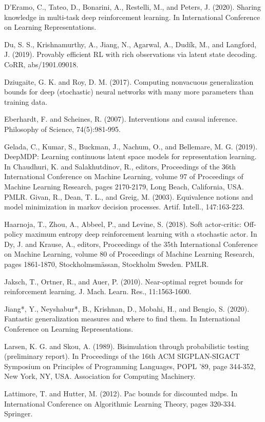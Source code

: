 \documentclass[10pt]{article}
\begin{document}
D'Eramo, C., Tateo, D., Bonarini, A., Restelli, M., and Peters, J. (2020). Sharing knowledge in multi-task deep reinforcement learning. In International Conference on Learning Representations.

Du, S. S., Krishnamurthy, A., Jiang, N., Agarwal, A., Dudík, M., and Langford, J. (2019). Provably efficient RL with rich observations via latent state decoding. CoRR, abs/1901.09018.

Dziugaite, G. K. and Roy, D. M. (2017). Computing nonvacuous generalization bounds for deep (stochastic) neural networks with many more parameters than training data.

Eberhardt, F. and Scheines, R. (2007). Interventions and causal inference. Philosophy of Science, 74(5):981-995.

Gelada, C., Kumar, S., Buckman, J., Nachum, O., and Bellemare, M. G. (2019). DeepMDP: Learning continuous latent space models for representation learning. In Chaudhuri, K. and Salakhutdinov, R., editors, Proceedings of the 36th International Conference on Machine Learning, volume 97 of Proceedings of Machine Learning Research, pages 2170-2179, Long Beach, California, USA. PMLR. Givan, R., Dean, T. L., and Greig, M. (2003). Equivalence notions and model minimization in markov decision processes. Artif. Intell., 147:163-223.

Haarnoja, T., Zhou, A., Abbeel, P., and Levine, S. (2018). Soft actor-critic: Off-policy maximum entropy deep reinforcement learning with a stochastic actor. In Dy, J. and Krause, A., editors, Proceedings of the 35th International Conference on Machine Learning, volume 80 of Proceedings of Machine Learning Research, pages 1861-1870, Stockholmsmässan, Stockholm Sweden. PMLR.

Jaksch, T., Ortner, R., and Auer, P. (2010). Near-optimal regret bounds for reinforcement learning. J. Mach. Learn. Res., 11:1563-1600.

Jiang*, Y., Neyshabur*, B., Krishnan, D., Mobahi, H., and Bengio, S. (2020). Fantastic generalization measures and where to find them. In International Conference on Learning Representations.

Larsen, K. G. and Skou, A. (1989). Bisimulation through probabilistic testing (preliminary report). In Proceedings of the 16th ACM SIGPLAN-SIGACT Symposium on Principles of Programming Languages, POPL '89, page 344-352, New York, NY, USA. Association for Computing Machinery.

Lattimore, T. and Hutter, M. (2012). Pac bounds for discounted mdps. In International Conference on Algorithmic Learning Theory, pages 320-334. Springer.
\end{document}
